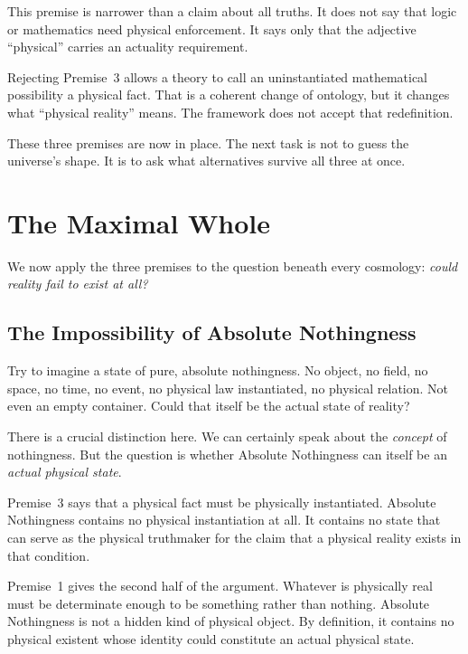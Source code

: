 \documentclass[11pt]{article}
\theoremstyle{canonstyle}
\begin{document}
This premise is narrower than a claim about all truths. It does not say that logic or mathematics need physical enforcement. It says only that the adjective ``physical'' carries an actuality requirement.

\begin{ifyoudisagree}
Rejecting Premise~3 allows a theory to call an uninstantiated mathematical possibility a physical fact. That is a coherent change of ontology, but it changes what ``physical reality'' means. The framework does not accept that redefinition.
\end{ifyoudisagree}

These three premises are now in place. The next task is not to guess the universe's shape. It is to ask what alternatives survive all three at once.

\newpage
\section{The Maximal Whole}

We now apply the three premises to the question beneath every cosmology: \emph{could reality fail to exist at all?}

\subsection{The Impossibility of Absolute Nothingness}

\begin{reflect}
Try to imagine a state of pure, absolute nothingness. No object, no field, no space, no time, no event, no physical law instantiated, no physical relation. Not even an empty container. Could that itself be the actual state of reality?
\end{reflect}

There is a crucial distinction here. We can certainly speak about the \emph{concept} of nothingness. But the question is whether Absolute Nothingness can itself be an \emph{actual physical state}.

Premise~3 says that a physical fact must be physically instantiated. Absolute Nothingness contains no physical instantiation at all. It contains no state that can serve as the physical truthmaker for the claim that a physical reality exists in that condition.

Premise~1 gives the second half of the argument. Whatever is physically real must be determinate enough to be something rather than nothing. Absolute Nothingness is not a hidden kind of physical object. By definition, it contains no physical existent whose identity could constitute an actual physical state.
\end{document}

